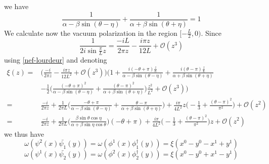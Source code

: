 we have
\begin{equation}\label{nef-lourdeur}
\frac{1}{\alpha - \beta \sin (\theta - \eta)}
   + \frac{1}{\alpha + \beta \sin (\theta + \eta)} 
= 1
\end{equation}
We calculate now the vacuum polarization in the region $[-\frac{L}{2}, 0)$. Since
\begin{equation*}
\frac{1}{2i \sin \frac{\pi}{L}z } = \frac{-iL}{2 \pi z} - \frac{i \pi z}{12L} + \mathcal{O}(z^3) 
\end{equation*}
using \cref{nef-lourdeur} and denoting
\begin{equation}\label{nef-xi}
\begin{split}
\xi(z) = & \Big( \frac{-i}{2 \pi z} - \frac{i \pi z}{12L^2} + \mathcal{O}(z^3) \Big)
\Big( 1 + \frac{i(-\theta + \pi)\frac{z}{L}}{\alpha - \beta\sin(\theta - \eta)} + \frac{i(\theta - \pi)\frac{z}{L}}{\alpha + \beta\sin(\theta + \eta)}  \\
& - \frac{1}{2}\Big(\frac{(-\theta + \pi)^2}{\alpha - \beta \sin (\theta - \eta)}  
+ \frac{(\theta - \pi)^2}{\alpha + \beta \sin (\theta + \eta)} \Big)\frac{z^2}{L^2}
+  \mathcal{O}(z^3) \Big)  \\
= & \frac{-i}{2 \pi z} + \frac{1}{2\pi L}\Big( \frac{-\theta + \pi}{\alpha - \beta\sin(\theta - \eta)} + \frac{\theta - \pi}{\alpha + \beta\sin(\theta + \eta)} \Big)  
 + \frac{i\pi}{4 L^2}z \big( -\frac{1}{3} + \frac{(\theta - \pi)^2}{\pi^2}\big) + \mathcal{O}(z^2) \\
= &  \frac{-i}{2 \pi z} 
+ \frac{1}{2\pi L}\Big( \frac{\beta \sin \theta \cos \eta}{\alpha + \beta \sin \eta \cos \theta}\Big) (-\theta + \pi) 
+ \frac{i\pi}{4 L^2}\big( -\frac{1}{3} + \frac{(\theta - \pi)^2}{\pi^2}\big)z+ \mathcal{O}(z^2)
\end{split}
\end{equation}
we thus have
\begin{equation*}
\omega(\psi^2(x) \bar{\psi_1}(y)) = \omega(\phi^1(x) \phi^\dagger_1(y)) 
= \xi( x^0 - y^0 - x^1 +y^1)
\end{equation*}
\begin{equation*}
\omega(\psi^1(x) \bar{\psi_2}(y)) =  \omega(\phi^2(x) \phi^\dagger_2(y)) 
= \xi(x^0 - y^0 + x^1 -y^1)
\end{equation*}
